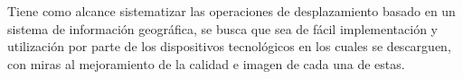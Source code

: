 Tiene como alcance sistematizar las operaciones de desplazamiento basado en un sistema de información geográfica, se busca que sea de fácil implementación y utilización por parte de los dispositivos tecnológicos en los cuales se descarguen, con miras al mejoramiento de la calidad e imagen de cada una de estas.







        
